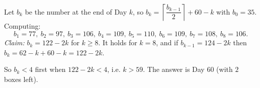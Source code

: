 Let $b_k$ be the number at the end of Day $k$, so $b_k=\left\lceil\dfrac{b_{k-1}}{2}\right\rceil+60-k$ with $b_0=35$. Computing:
\[b_1=77,\ b_2=97,\ b_3=106,\ b_4=109,\ b_5=110,\ b_6=109,\ b_7=108,\ b_8=106.\]
\emph{Claim:} $b_k=122-2k$ for $k\ge8$. It holds for $k=8$, and if $b_{k-1}=124-2k$ then $b_k=62-k+60-k=122-2k$.

So $b_k<4$ first when $122-2k<4$, i.e. $k>59$. The answer is Day $\boxed{60}$ (with $2$ boxes left).
